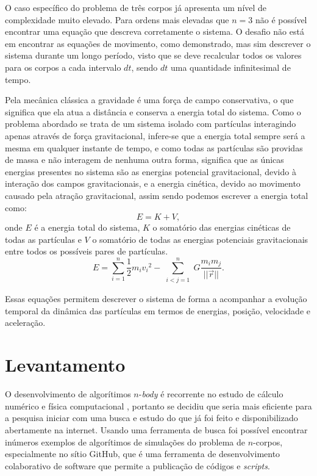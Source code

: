 \documentclass[
	12pt,				%
	a4paper,			%
	english,			%
	openright,				%
	brazil,				%
	oneside]{abntex2}
\begin{document}
	O caso específico do problema de três corpos já apresenta um nível de complexidade muito elevado. Para ordens mais elevadas que $n = 3$ não é possível encontrar uma equação que descreva corretamente o sistema. O desafio não está em encontrar as equações de movimento, como demonstrado, mas sim descrever o sistema durante um longo período, visto que se deve recalcular todos os valores para os corpos a cada intervalo $dt$, sendo $dt$ uma quantidade infinitesimal de tempo.
	
	Pela mecânica clássica a gravidade é uma força de campo conservativa, o que significa que ela atua a distância e conserva a energia total do sistema. Como o problema abordado se trata de um sistema isolado com partículas interagindo apenas através de força gravitacional, infere-se que a energia total sempre será a mesma em qualquer instante de tempo, e como todas as partículas são providas de massa e não interagem de nenhuma outra forma, significa que as únicas energias presentes no sistema são as energias potencial gravitacional, devido à interação dos campos gravitacionais, e a energia cinética, devido ao movimento causado pela atração gravitacional, assim sendo podemos escrever a energia total como:
	\[E = K + V,\]
onde $E$ é a energia total do sistema, $K$ o somatório das energias cinéticas de todas as partículas e $V$ o somatório de todas as energias potenciais gravitacionais entre todos os possíveis pares de partículas.
	\[ E = \sum\limits_{i=1}^{n} \dfrac{1}{2} m_i {v_i}^2 - \sum\limits_{\substack{i < j = 1}}^{n}G \dfrac{m_i m_j}{||\vec{r}||}. \]
	
	Essas equações permitem descrever o sistema de forma a acompanhar a evolução temporal da dinâmica das partículas em termos de energias, posição, velocidade e aceleração.
	
	
\section{Levantamento}

	O desenvolvimento de algorítimos $n$-\textit{body} é recorrente no estudo de cálculo numérico e física computacional \cite{nyland}, portanto se decidiu que seria mais eficiente para a pesquisa iniciar com uma busca e estudo do que já foi feito e disponibilizado abertamente na internet. Usando uma ferramenta de busca foi possível encontrar inúmeros exemplos de algorítimos de simulações do problema de $n$-corpos, especialmente no sítio GitHub, que é uma ferramenta de desenvolvimento colaborativo de software que permite a publicação de códigos e \textit{scripts}.
	
\end{document}
